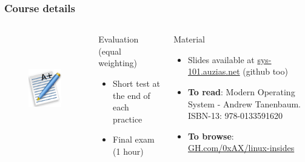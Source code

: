   \begin{frame}
    \frametitle{Course details}
    \begin{columns}
        \begin{figure}[t]
          \centering
          \includegraphics[height=4cm]{./imgs/grade.pdf}
          \label{fig:marks}
        \end{figure}
        \begin{block}{Evaluation (equal weighting)}
          \begin{itemize}
            \item Short test at the end of each practice
            \item Final exam (1 hour)
          \end{itemize}
        \end{block}
        \begin{block}{Material}
          \begin{itemize}
            \item Slides available at \color{blue}\href{http://sys-101.auzias.net}{sys-101.auzias.net} \color{black} (github too)
            \item \textbf{To read}: Modern Operating System - Andrew Tanenbaum.  ISBN-13: 978-0133591620
            \item \textbf{To browse}: \color{blue}\href{https://github.com/0xAX/linux-insides}{GH.com/0xAX/linux-insides}\color{black}
          \end{itemize}
        \end{block}
    \end{columns}
  \end{frame}
